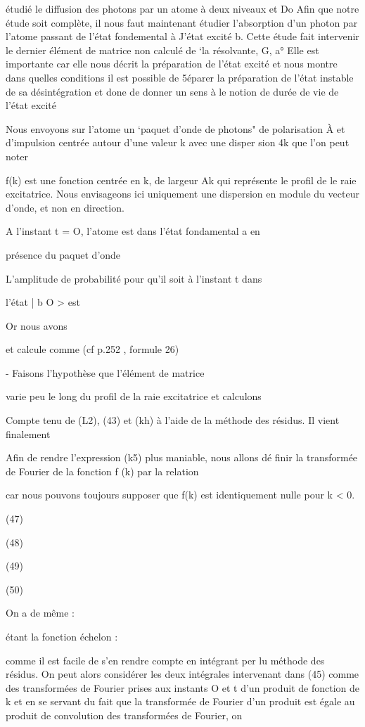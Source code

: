 étudié le diffusion des photons par un atome à deux niveaux  et Do Afin que
notre étude soit complète, il nous faut maintenant étudier l'absorption d'un
photon par l'atome passant de l'état fondemental à J'état excité b. Cette
étude fait intervenir le dernier élément de matrice non calculé de ‘la résolvante, G, a° Elle est importante car elle nous décrit la préparation de
l'état excité et nous montre dans quelles conditions il est possible de 5éparer la préparation de l'état instable de sa désintégration et done de donner
un sens à le notion de durée de vie de l'état excité

Nous envoyons sur l'atome un ‘paquet d'onde de photons" de
polarisation À et d'impulsion centrée autour d'une valeur k avec une disper
sion 4k que l'on peut noter

f(k) est une fonction centrée en k, de largeur Ak qui représente le profil de
le raie excitatrice. Nous envisageons ici uniquement une dispersion en module
du vecteur d'onde, et non en direction.

A l'instant t = O, l'atome est dans l'état fondamental a en

présence du paquet d'onde

L'amplitude de probabilité pour qu'il soit à l'instant t dans

l'état | b O > est

Or nous avons

et  calcule comme  (cf p.252 , formule 26)

- Faisons l'hypothèse que l'élément de matrice 

varie peu le long du profil de la raie excitatrice et calculons

 Compte tenu de (L2), (43) et (kh) à l'aide de la méthode
des résidus. Il vient finalement

Afin de rendre l'expression (k5) plus maniable, nous allons dé
finir la transformée de Fourier de la fonction f (k) par la relation

car nous pouvons toujours supposer que f(k) est identiquement nulle pour k < 0.

(47)

(48)

(49)

(50)

On a de même :

 étant la fonction échelon : 

comme il est facile de s'en rendre compte en intégrant per lu méthode des
résidus. On peut alors considérer les deux intégrales intervenant dans (45)
comme des transformées de Fourier prises aux instants O et t d'un produit de
fonction de k et en se servant du fait que la transformée de Fourier d'un
produit est égale au produit de convolution des transformées de Fourier, on

